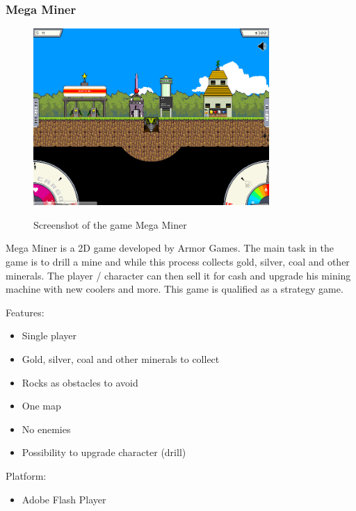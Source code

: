 \documentclass[12p]{article}
\begin{document}

\newpage
\subsubsection[Mega Miner]{Mega Miner \cite{MegaMiner}}

\begin{figure}[ht]
 \center
 \includegraphics[width=0.8\textwidth]{StateOfTheArtScreenshots/mega_miner}
 \label{sec:StateOfTheArt_Screenshots_MegaMiner}
 \caption{Screenshot of the game Mega Miner}
\end{figure}

Mega Miner is a 2D game developed by Armor Games. The main task in the game is to drill a mine and while this process collects gold, silver, coal and other minerals. The player / character can then sell it for cash and upgrade his mining machine with new coolers and more. This game is qualified as a strategy game.

Features:

\begin{itemize}
 \item Single player
 \item Gold, silver, coal and other minerals to collect
 \item Rocks as obstacles to avoid
 \item One map
 \item No enemies
 \item Possibility to upgrade character (drill)
\end{itemize}

Platform: 

\begin{itemize}
  \item Adobe Flash Player
\end{itemize}
\end{document}
